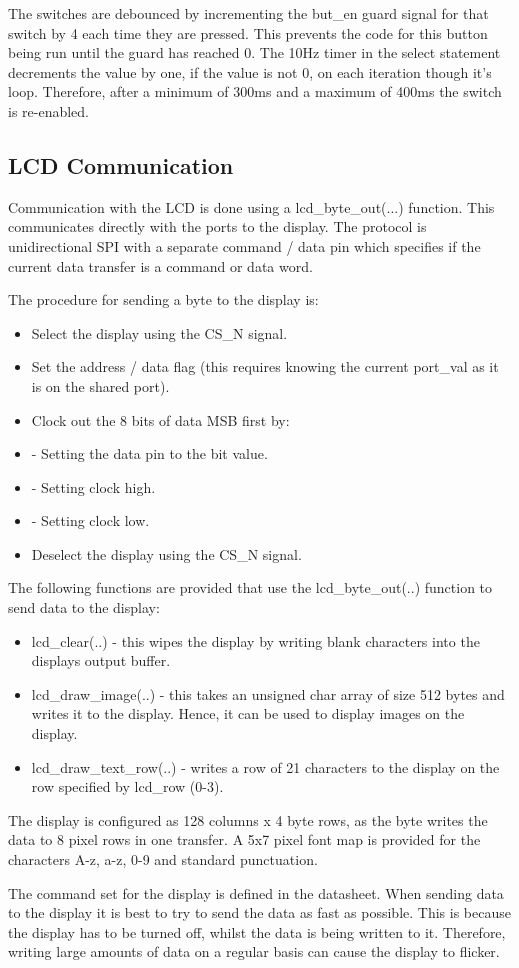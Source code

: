 The switches are debounced by incrementing the but\_en guard signal for that switch by 4 each time they are pressed.
This prevents the code for this button being run until the guard has reached 0.
The 10Hz timer in the select statement decrements the value by one, if the value is not 0, on each iteration though it's loop.
Therefore, after a minimum of 300ms and a maximum of 400ms the switch is re-enabled.


\subsection{LCD Communication}

Communication with the LCD is done using a lcd\_byte\_out(...) function.
This communicates directly with the ports to the display.
The protocol is unidirectional SPI with a separate command / data pin which specifies if the current data transfer is a command or data word.

The procedure for sending a byte to the display is:

\begin{itemize}
\item Select the display using the CS\_N signal.
\item Set the address / data flag (this requires knowing the current port\_val as it is on the shared port).
\item Clock out the 8 bits of data MSB first by:
\item - Setting the data pin to the bit value.
\item - Setting clock high.
\item - Setting clock low.
\item Deselect the display using the CS\_N signal.
\end{itemize}

The following functions are provided that use the lcd\_byte\_out(..) function to send data to the display:

\begin{itemize}
\item lcd\_clear(..) - this wipes the display by writing blank characters into the displays output buffer.
\item lcd\_draw\_image(..) - this takes an unsigned char array of size 512 bytes and writes it to the display. Hence, it can be used to display images on the display.
\item lcd\_draw\_text\_row(..) - writes a row of 21 characters to the display on the row specified by lcd\_row (0-3).
\end{itemize}

The display is configured as 128 columns x 4 byte rows, as the byte writes the data to 8 pixel rows in one transfer.
A 5x7 pixel font map is provided for the characters A-z, a-z, 0-9 and standard punctuation.

The command set for the display is defined in the datasheet.
When sending data to the display it is best to try to send the data as fast as possible.
This is because the display has to be turned off, whilst the data is being written to it.
Therefore, writing large amounts of data on a regular basis can cause the display to flicker.
